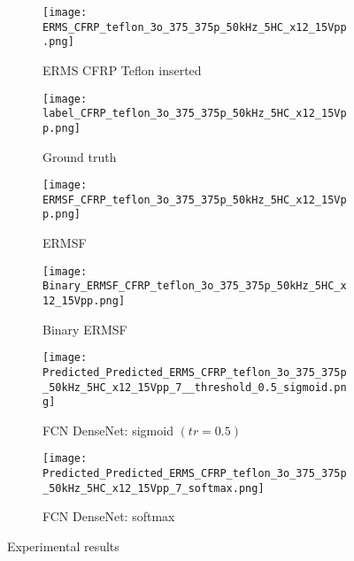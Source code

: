 	\begin{figure} [!h]
		\centering
		\begin{subfigure}[b]{0.47\textwidth}
			\centering
			\texttt{[image: ERMS\_CFRP\_teflon\_3o\_375\_375p\_50kHz\_5HC\_x12\_15Vpp.png]}
			\caption{ERMS CFRP Teflon inserted}
			\label{fig:Delamination}
		\end{subfigure}			
		\hfill
		\begin{subfigure}[b]{0.47\textwidth}
			\centering 	
			\texttt{[image: label\_CFRP\_teflon\_3o\_375\_375p\_50kHz\_5HC\_x12\_15Vpp.png]}
			\caption{Ground truth} 
			\label{fig:damage_label}
		\end{subfigure}
		\hfill
		\begin{subfigure}[b]{0.47\textwidth}
			\centering
			\texttt{[image: ERMSF\_CFRP\_teflon\_3o\_375\_375p\_50kHz\_5HC\_x12\_15Vpp.png]}
			\caption{ERMSF} 
			\label{fig:ERMSF_CFRP_teflon}
		\end{subfigure}
		\hfill
		\begin{subfigure}[b]{0.47\textwidth}
		\centering
		\texttt{[image: Binary\_ERMSF\_CFRP\_teflon\_3o\_375\_375p\_50kHz\_5HC\_x12\_15Vpp.png]}
		\caption{Binary ERMSF} 
		\label{fig:Binary_ERMSF_CFRP}
		\end{subfigure}
		\hfill
		\begin{subfigure}[b]{0.47\textwidth}
			\centering
			\texttt{[image: Predicted\_Predicted\_ERMS\_CFRP\_teflon\_3o\_375\_375p\_50kHz\_5HC\_x12\_15Vpp\_7\_\_threshold\_0.5\_sigmoid.png]}
			\caption{FCN DenseNet: sigmoid \((tr = 0.5)\)} 
			\label{fig:EXP_predict_sigmoid}
		\end{subfigure}
		\hfill
		\begin{subfigure}[b]{0.47\textwidth}
			\centering
			\texttt{[image: Predicted\_Predicted\_ERMS\_CFRP\_teflon\_3o\_375\_375p\_50kHz\_5HC\_x12\_15Vpp\_7\_softmax.png]}
			\caption{FCN DenseNet: softmax} 
			\label{fig:EXP_predict_softmax}
		\end{subfigure}
			\caption{Experimental results}
			\label{fig:Exp_ERMS_teflon}
		\end{figure}
